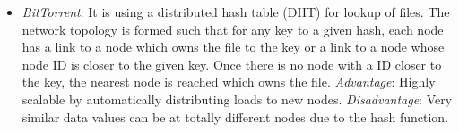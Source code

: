 \documentclass{article}
\begin{document}
\begin{enumerate}[1]
\begin{itemize}
            \item \textit{BitTorrent}: It is using a distributed hash table (DHT) for lookup of files. The network topology is formed such that for any key to a given hash,
                  each node has a link to a node which owns the file to the key or a link to a node whose node ID is closer to the given key. Once there is no node with
                  a ID closer to the key, the nearest node is reached which owns the file.
                  \textit{Advantage}: Highly scalable by automatically distributing loads to new nodes.
                  \textit{Disadvantage}: Very similar data values can be at totally different nodes due to the hash function.
          \end{itemize}
  \end{enumerate}
\end{document}
